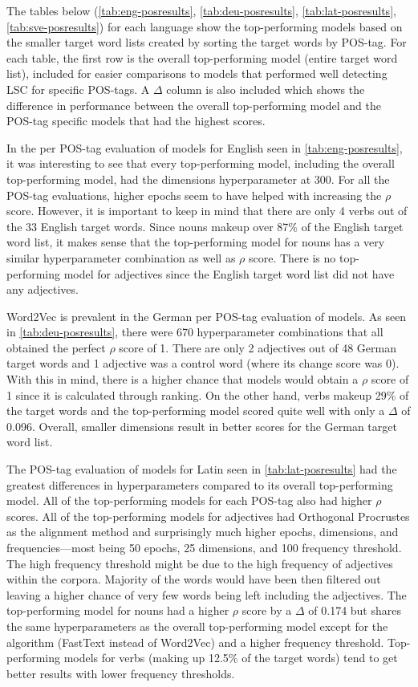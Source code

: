 The tables below (\autoref{tab:eng-posresults}, \autoref{tab:deu-posresults}, \autoref{tab:lat-posresults}, \autoref{tab:sve-posresults}) for each language show the top-performing models based on the smaller target word lists created by sorting the target words by POS-tag. For each table, the first row is the overall top-performing model (entire target word list), included for easier comparisons to models that performed well detecting LSC for specific POS-tags. A $\Delta$ column is also included which shows the difference in performance between the overall top-performing model and the POS-tag specific models that had the highest scores. 

In the per POS-tag evaluation of models for English seen in \autoref{tab:eng-posresults}, it was interesting to see that every top-performing model, including the overall top-performing model, had the dimensions hyperparameter at 300. For all the POS-tag evaluations, higher epochs seem to have helped with increasing the $\rho$ score. However, it is important to keep in mind that there are only 4 verbs out of the 33 English target words. Since nouns makeup over 87\% of the English target word list, it makes sense that the top-performing model for nouns has a very similar hyperparameter combination as well as $\rho$ score. There is no top-performing model for adjectives since the English target word list did not have any adjectives. 


Word2Vec is prevalent in the German per POS-tag evaluation of models. As seen in \autoref{tab:deu-posresults}, there were 670 hyperparameter combinations that all obtained the perfect $\rho$ score of 1. There are only 2 adjectives out of 48 German target words and 1 adjective was a control word (where its change score was 0). With this in mind, there is a higher chance that models would obtain a $\rho$ score of 1 since it is calculated through ranking. On the other hand, verbs makeup 29\% of the target words and the top-performing model scored quite well with only a $\Delta$ of 0.096. Overall, smaller dimensions result in better scores for the German target word list. 


The POS-tag evaluation of models for Latin seen in \autoref{tab:lat-posresults} had the greatest differences in hyperparameters compared to its overall top-performing model. All of the top-performing models for each POS-tag also had higher $\rho$ scores. All of the top-performing models for adjectives had Orthogonal Procrustes as the alignment method and surprisingly much higher epochs, dimensions, and frequencies—most being 50 epochs, 25 dimensions, and 100 frequency threshold. The high frequency threshold might be due to the high frequency of adjectives within the corpora. Majority of the words would have been then filtered out leaving a higher chance of very few words being left including the adjectives. The top-performing model for nouns had a higher $\rho$ score by a $\Delta$ of 0.174 but shares the same hyperparameters as the overall top-performing model except for the algorithm (FastText instead of Word2Vec) and a higher frequency threshold. Top-performing models for verbs (making up 12.5\% of the target words) tend to get better results with lower frequency thresholds.


